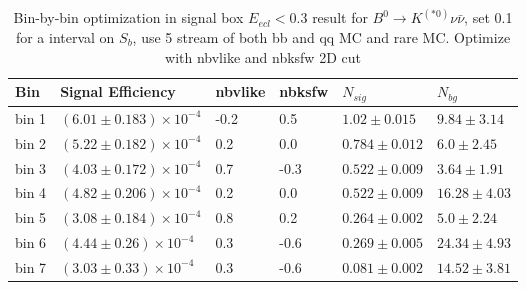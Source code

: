 \begin{table}[h]
\small
\begin{center}
\begin{tabular}{ |p{0.8cm}||p{3.7cm}||p{1.2cm}||p{1.2cm}||p{2.6cm}||p{2.7cm}| }
\hline
 Bin & Signal Efficiency & nbvlike & nbksfw & $N_{sig}$ & $N_{bg}$  \\
 \hline
 bin 1  & $(6.01 \pm 0.183) \times 10^{-4}$ &-0.2&0.5&$1.02\pm 0.015 $  &$9.84\pm 3.14 $\\ %
 \hline
 bin 2  & $(5.22 \pm 0.182)\times 10^{-4}$ &0.2& 0.0&$0.784 \pm 0.012 $&$6.0\pm 2.45 $\\ %
 \hline
 bin 3  & $(4.03 \pm 0.172)\times 10^{-4}$ &0.7&-0.3&$0.522 \pm 0.009 $&$3.64\pm 1.91 $\\ %
 \hline
 bin 4  & $(4.82 \pm 0.206)\times 10^{-4}$ &0.2&0.0&$0.522 \pm 0.009 $&$16.28\pm 4.03 $ \\ %
 \hline
 bin 5  & $(3.08\pm 0.184) \times 10^{-4}$ &0.8& 0.2&$0.264 \pm 0.002 $&$5.0\pm 2.24 $ \\ %
 \hline
 bin 6  & $(4.44\pm 0.26) \times 10^{-4}$ &0.3& -0.6&$0.269\pm 0.005 $&$24.34 \pm 4.93 $\\ %
 \hline
 bin 7  & $(3.03 \pm 0.33)\times 10^{-4}$ &0.3&-0.6&$0.081 \pm 0.002 $&$ 14.52\pm 3.81 $ \\ %
 \hline
 \hline
\end{tabular}

\caption{Bin-by-bin optimization in signal box $E_{ecl} < 0.3$ result for $B^0 \rightarrow K^{(*0)} \nu \bar{\nu}$, set 0.1 for a interval on $S_b$, use 5 stream of both bb and qq MC and rare MC. Optimize with nbvlike and nbksfw 2D cut } \label{t:optk0}
\end{center}
\end{table}

